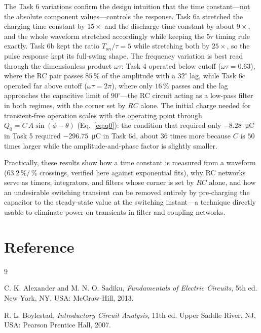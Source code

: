\documentclass[12pt,a4paper]{article}
\begin{document}
	The Task 6 variations confirm the design intuition that the time
	constant---not the absolute component values---controls the
	response.  Task 6a stretched the charging time constant by
	$15\times$ and the discharge time constant by about $9\times$, and
	the whole waveform stretched accordingly while keeping the $5\tau$
	timing rule exactly.  Task 6b kept the ratio $T_{on}/\tau = 5$ while
	stretching both by $25\times$, so the pulse response kept its
	full-swing shape.  The frequency variation is best read through the
	dimensionless product $\omega\tau$: Task 4 operated below cutoff
	($\omega\tau = 0.63$), where the RC pair passes $85\,\%$ of the
	amplitude with a $32^\circ$ lag, while Task 6c operated far above
	cutoff ($\omega\tau = 2\pi$), where only $16\,\%$ passes and the lag
	approaches the capacitive limit of $90^\circ$---the RC circuit
	acting as a low-pass filter in both regimes, with the corner set by
	$RC$ alone.  The initial charge needed for transient-free operation
	scales with the operating point through
	$Q_0 = C\,A\sin(\phi - \theta)$ (Eq.~\eqref{eq:q0}): the condition
	that required only $-8.28$~\si{\micro\coulomb} in Task 5 required
	$-296.75$~\si{\micro\coulomb} in Task 6d, about $36$ times more
	because $C$ is $50$ times larger while the amplitude-and-phase
	factor is slightly smaller.
	
	Practically, these results show how a time constant is measured
	from a waveform (63.2\,\%/\,\% crossings, verified here against
	exponential fits), why RC networks serve as timers, integrators,
	and filters whose corner is set by $RC$ alone, and how an
	undesirable switching transient can be removed entirely by
	pre-charging the capacitor to the steady-state value at the
	switching instant---a technique directly usable to eliminate
	power-on transients in filter and coupling networks.
	
	\section{Reference}
	\begin{thebibliography}{9}
		\itemsep4pt
		
		C. K. Alexander and M. N. O. Sadiku, \textit{Fundamentals of
			Electric Circuits}, 5th ed. New York, NY, USA: McGraw-Hill, 2013.
		
		R. L. Boylestad, \textit{Introductory Circuit Analysis}, 11th ed.
		Upper Saddle River, NJ, USA: Pearson Prentice Hall, 2007.
		
		
	\end{thebibliography}
	
\end{document}
